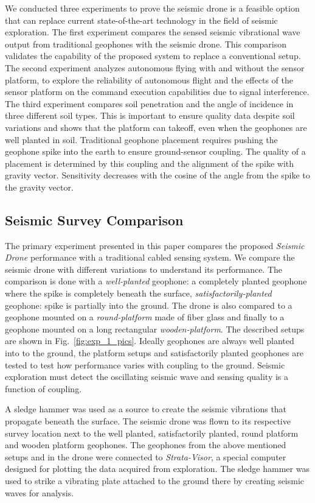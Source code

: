We conducted three experiments to prove the seismic drone is a feasible option that can replace current state-of-the-art technology in the field of seismic exploration. The first experiment compares the sensed seismic vibrational wave output from traditional geophones with the seismic drone. This comparison validates the capability  of the proposed system to replace a conventional setup. The second experiment analyzes autonomous flying with and without the sensor platform, to explore the reliability of autonomous flight and the effects of the sensor platform on the command execution capabilities due to signal interference. The third experiment compares soil penetration and the angle of incidence in three different soil types. This is important to ensure quality data despite soil variations and shows that the platform can takeoff, even when the geophones are well planted in soil. Traditional geophone placement requires pushing the geophone spike into the earth to ensure ground-sensor coupling. The quality of a placement is determined by this coupling and the alignment of the spike with gravity vector. Sensitivity decreases with the cosine of the angle from the spike to the gravity vector.

\subsection{Seismic Survey Comparison}

The primary experiment presented in this paper compares the proposed \emph{Seismic Drone} performance with a traditional cabled sensing system. We compare the seismic drone with different variations to understand its performance. The comparison is done with a \emph{well-planted} geophone: a completely planted geophone where the spike is completely beneath the surface, \emph{satisfactorily-planted} geophone: spike is partially into the ground. The drone is also compared to a geophone mounted on a \emph{round-platform} made of fiber glass and finally to a geophone mounted on a long rectangular \emph{wooden-platform}. The described setups are shown in Fig.~\ref{fig:exp_1_pics}. Ideally geophones are always well planted into to the ground, the platform setups and satisfactorily planted geophones are tested to test how performance varies with coupling to the ground. Seismic exploration must detect the oscillating seismic wave and sensing quality is a function of coupling. 

A sledge hammer was used as a source to create the seismic vibrations that propagate beneath the surface. The seismic drone was flown to its respective survey location next to the well planted, satisfactorily planted, round platform and wooden platform geophones. The geophones from the above mentioned setups and in the drone were connected to \emph{Strata-Visor}, a special computer designed for plotting the data acquired from exploration. The sledge hammer was used to strike a vibrating plate attached to the ground there by creating seismic waves for analysis.

